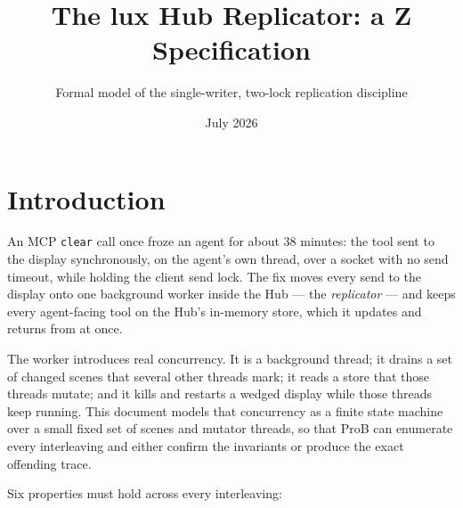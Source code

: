 \documentclass[a4paper,10pt,fleqn]{article}
\begin{document}
\title{The lux Hub Replicator: a Z Specification}
\author{Formal model of the single-writer, two-lock replication discipline}
\date{July 2026}
\maketitle

\section{Introduction}

An MCP \texttt{clear} call once froze an agent for about 38 minutes: the
tool sent to the display synchronously, on the agent's own thread, over a
socket with no send timeout, while holding the client send lock.  The fix
moves every send to the display onto one background worker inside the Hub
--- the \emph{replicator} --- and keeps every agent-facing tool on the
Hub's in-memory store, which it updates and returns from at once.

The worker introduces real concurrency.  It is a background thread; it
drains a set of changed scenes that several other threads mark; it reads a
store that those threads mutate; and it kills and restarts a wedged
display while those threads keep running.  This document models that
concurrency as a finite state machine over a small fixed set of scenes and
mutator threads, so that ProB can enumerate every interleaving and either
confirm the invariants or produce the exact offending trace.

Six properties must hold across every interleaving:
\end{document}
